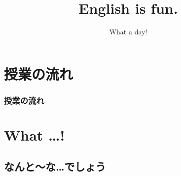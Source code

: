 \documentclass[aspectratio=169,xcolor={dvipsnames,table}]{beamer}
\title{English is fun.}
\subtitle{What a day!}
\author{}
\institute[]{}
\date[]
\begin{document}
\begin{frame}[plain]
  \titlepage
\end{frame}

\section*{授業の流れ}
\begin{frame}[plain]
  \frametitle{授業の流れ}
  \tableofcontents
\end{frame}

\section{What \ldots ! }
\subsection{なんと～な\ldots でしょう}
\end{document}
